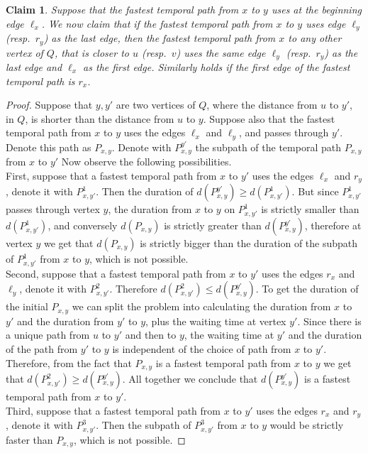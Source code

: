 \documentclass[11pt,a4paper]{article}
\newtheorem{claim}[theorem]{Claim}
\theoremstyle{remark}
\theoremstyle{definition}
\begin{document}
\begin{claim}\label{claim:FPT-unlabeldPaths-01}
    Suppose that the fastest temporal path from $x$ to $y$ uses at the beginning edge $\ell_x$.
    We now claim that if the fastest temporal path from $x$ to $y$ uses edge $\ell_y$ (resp.~$r_y$) as the last edge,
    then the fastest temporal path from $x$ to any other vertex of $Q$, that is closer to $u$ (resp.~$v$) 
    uses the same edge $\ell_y$ (resp.~$r_y$) as the last edge and $\ell_x$ as the first edge.
    Similarly holds if the first edge of the fastest temporal path is $r_x$.
\end{claim}
\begin{proof}
    Suppose that $y, y'$ are two vertices of $Q$, where the distance from $u$ to $y'$, in $Q$, is shorter than the distance from $u$ to $y$.
    Suppose also that the fastest temporal path from $x$ to $y$ uses the edges $\ell_x$ and $\ell_y$, and passes through $y'$. Denote this path as $P_{x,y}$.
    Denote with $P_{x,y}^{y'}$ the subpath of the temporal path $P_{x,y}$ from $x$ to $y'$
    Now observe the following possibilities. %
    \\
    First, suppose that a fastest temporal path from $x$ to $y'$ uses the edges $\ell_x$ and $r_y$, denote it with $P_{x,y'}^1$.
    Then the duration of $d(P_{x,y}^{y'}) \geq  d(P_{x,y'}^1)$.
    But since $P_{x,y'}^1$ passes through vertex $y$, the duration from $x$ to $y$ on $P_{x,y'}^1$ is strictly smaller than $d(P_{x,y'}^1)$, and conversely 
    $d(P_{x,y})$ is strictly greater than $d(P_{x,y}^{y'})$,
    therefore at vertex $y$ we get that 
    $d(P_{x,y})$ is strictly bigger than the duration of the subpath of $P_{x,y'}^1$ from $x$ to $y$, which is not possible. %
    \\
    Second, suppose that a fastest temporal path from $x$ to $y'$ uses the edges $r_x$ and $\ell_y$, denote it with $P_{x,y'}^2$.
    Therefore $d(P_{x,y'}^2) \leq d(P_{x,y}^{y'})$.
    To get the duration of the initial $P_{x,y}$ we can split the problem into calculating the duration from $x$ to $y'$ and the duration from $y'$ to $y$, plus the waiting time at vertex $y'$.
    Since there is a unique path from $u$ to $y'$ and then to $y$, the waiting time at $y'$ and the duration of the path from $y'$ to $y$ is independent of the choice of path from $x$ to $y'$. 
    Therefore, from the fact that $P_{x,y}$ is a fastest temporal path from $x$ to $y$ we get that $d(P_{x,y'}^2) \geq d(P_{x,y}^{y'})$.
    All together we conclude that $d(P_{x,y}^{y'})$ is a fastest temporal path from $x$ to $y'$.%
    \\
    Third, suppose that a fastest temporal path from $x$ to $y'$ uses the edges $r_x$ and $r_y$, denote it with $P_{x,y'}^3$.
    Then the subpath of $P_{x,y'}^3$ from $x$ to $y$ would be strictly faster than $P_{x,y}$, which is not possible.
\end{proof}
\end{document}
